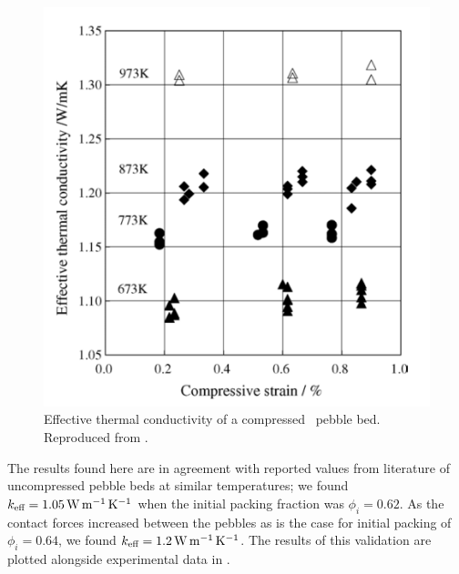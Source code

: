 \begin{figure}[ht]
\centering
    \includegraphics[width=\singleimagewidth]{figures/tanigawa.png}
    \caption{Effective thermal conductivity of a compressed \lit~pebble bed. Reproduced from \cite{Tanigawa2005801}.}
    \label{fig:tanigawa}
\end{figure}

The results found here are in agreement with reported values from literature of uncompressed pebble beds at similar temperatures;\cite{Hatano2003} we found $k_\text{eff} =\SI{1.05}{\watt\per\meter\per\kelvin}$ when the initial packing fraction was $\phi_i = 0.62$. As the contact forces increased between the pebbles as is the case for initial packing of $\phi_i = 0.64$, we found $k_\text{eff} =\SI{1.2}{\watt\per\meter\per\kelvin}$. The results of this validation are plotted alongside experimental data in .


